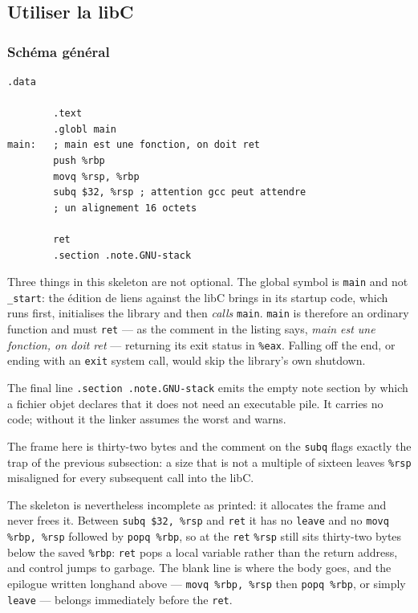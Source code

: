 \subsection{Utiliser la libC}
\subsubsection{Schéma général}
\begin{lstlisting}[language=gas]
        .data

        .text
        .globl main
main:   ; main est une fonction, on doit ret
        push %rbp
        movq %rsp, %rbp
        subq $32, %rsp ; attention gcc peut attendre
        ; un alignement 16 octets

        ret
        .section .note.GNU-stack
\end{lstlisting}

Three things in this skeleton are not optional. The global symbol is
\texttt{main} and not \texttt{\_start}: the édition de liens against the libC
brings in its startup code, which runs first, initialises the library and then
\emph{calls} \texttt{main}. \texttt{main} is therefore an ordinary function and
must \texttt{ret} --- as the comment in the listing says, \textit{main est une
fonction, on doit ret} --- returning its exit status in \texttt{\%eax}. Falling
off the end, or ending with an \texttt{exit} system call, would skip the
library's own shutdown.

\begin{remark}
  The final line \texttt{.section .note.GNU-stack} emits the empty note section
  by which a fichier objet declares that it does not need an executable pile. It
  carries no code; without it the linker assumes the worst and warns.
\end{remark}

\begin{remark}
  The frame here is thirty-two bytes and the comment on the \texttt{subq} flags
  exactly the trap of the previous subsection: a size that is not a multiple of
  sixteen leaves \texttt{\%rsp} misaligned for every subsequent call into the
  libC.
\end{remark}

\begin{remark}
  The skeleton is nevertheless incomplete as printed: it allocates the frame and
  never frees it. Between \texttt{subq \$32, \%rsp} and \texttt{ret} it has no
  \texttt{leave} and no \texttt{movq \%rbp, \%rsp} followed by
  \texttt{popq \%rbp}, so at the \texttt{ret} \texttt{\%rsp} still sits
  thirty-two bytes below the saved \texttt{\%rbp}: \texttt{ret} pops a local
  variable rather than the return address, and control jumps to garbage. The
  blank line is where the body goes, and the epilogue written longhand above ---
  \texttt{movq \%rbp, \%rsp} then \texttt{popq \%rbp}, or simply \texttt{leave}
  --- belongs immediately before the \texttt{ret}.
\end{remark}

